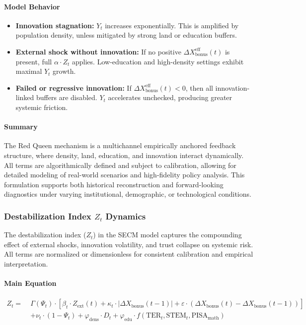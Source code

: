 \documentclass[12pt]{report}
\begin{document}
\paragraph{Model Behavior}
\begin{itemize}
  \item \textbf{Innovation stagnation:} $Y_t$ increases exponentially. This is amplified by population density, unless mitigated by strong land or education buffers.
  
  \item \textbf{External shock without innovation:} If no positive $\Delta X_{\text{bonus}}^{\text{eff}}(t)$ is present, full $ \alpha \cdot Z_t $ applies. Low-education and high-density settings exhibit maximal $Y_t$ growth.

  \item \textbf{Failed or regressive innovation:} If $\Delta X_{\text{bonus}}^{\text{eff}}(t) < 0$, then all innovation-linked buffers are disabled. $Y_t$ accelerates unchecked, producing greater systemic friction.
\end{itemize}

\paragraph{Summary}
The Red Queen mechanism is a multichannel empirically anchored feedback structure, where density, land, education, and innovation interact dynamically. All terms are algorithmically defined and subject to calibration, allowing for detailed modeling of real-world scenarios and high-fidelity policy analysis. This formulation supports both historical reconstruction and forward-looking diagnostics under varying institutional, demographic, or technological conditions.

\subsubsection{Destabilization Index $Z_t$ Dynamics}

The destabilization index ($Z_t$) in the SECM model captures the compounding effect of external shocks, innovation volatility, and trust collapse on systemic risk. All terms are normalized or dimensionless for consistent calibration and empirical interpretation.

\paragraph{Main Equation}
\begin{align*}
Z_t =\; & \Gamma(\Psi_t) \cdot \left[ \beta_t \cdot Z_{\text{ext}}(t) + \kappa_t \cdot \left| \Delta X_{\text{bonus}}(t-1) \right| + \varepsilon \cdot \left( \Delta X_{\text{bonus}}(t) - \Delta X_{\text{bonus}}(t-1) \right) \right] \\
& + \nu_t \cdot (1 - \Psi_t) + \varphi_{\text{dens}} \cdot D_t + \varphi_{\text{edu}} \cdot f(\text{TER}_t, \text{STEM}_t, \text{PISA}_{\text{math}})
\end{align*}
\end{document}
